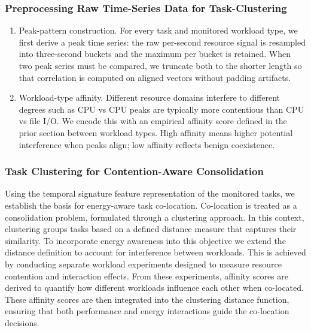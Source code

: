 \subsubsection{Preprocessing Raw Time-Series Data for Task-Clustering}
\label{sec:data_preprocessing_predictive}

\begin{enumerate}
    \item Peak-pattern construction. For every task and monitored workload type, we first derive a peak time series: the raw per-second resource signal is resampled into three-second buckets and the maximum per bucket is retained. When two peak series must be compared, we truncate both to the shorter length so that correlation is computed on aligned vectors without padding artifacts.
    \item Workload-type affinity. Different resource domains interfere to different degrees such as CPU vs CPU peaks are typically more contentious than CPU vs file I/O. We encode this with an empirical affinity score defined in the prior section between workload types. High affinity means higher potential interference when peaks align; low affinity reflects benign coexistence.
\end{enumerate}

\subsubsection{Task Clustering for Contention-Aware Consolidation}
\label{sec:task_clustering}

Using the temporal signature feature representation of the monitored tasks, we establish the basis for energy-aware task co-location. Co-location is treated as a consolidation problem, formulated through a clustering approach. In this context, clustering groups tasks based on a defined distance measure that captures their similarity. To incorporate energy awareness into this objective we extend the distance definition to account for interference between workloads. This is achieved by conducting separate workload experiments designed to measure resource contention and interaction effects. From these experiments, affinity scores are derived to quantify how different workloads influence each other when co-located. These affinity scores are then integrated into the clustering distance function, ensuring that both performance and energy interactions guide the co-location decisions.

